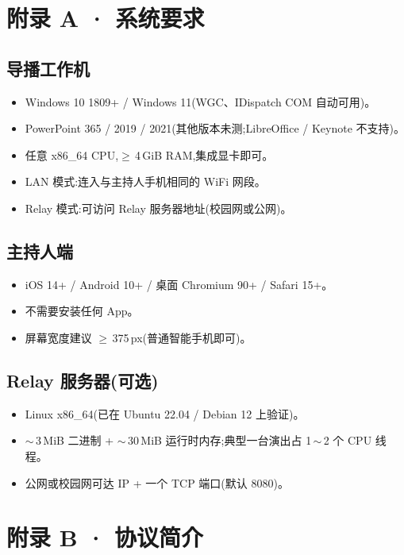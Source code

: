 \section*{附录 A · 系统要求}

\subsection*{导播工作机}
\begin{itemize}
  \item Windows 10 1809+ / Windows 11(WGC、IDispatch COM 自动可用)。
  \item PowerPoint 365 / 2019 / 2021(其他版本未测;LibreOffice / Keynote 不支持)。
  \item 任意 x86\_64 CPU,$\geq$\,4\,GiB RAM,集成显卡即可。
  \item LAN 模式:连入与主持人手机相同的 WiFi 网段。
  \item Relay 模式:可访问 Relay 服务器地址(校园网或公网)。
\end{itemize}

\subsection*{主持人端}
\begin{itemize}
  \item iOS 14+ / Android 10+ / 桌面 Chromium 90+ / Safari 15+。
  \item 不需要安装任何 App。
  \item 屏幕宽度建议 $\geq$\,375\,px(普通智能手机即可)。
\end{itemize}

\subsection*{Relay 服务器(可选)}
\begin{itemize}
  \item Linux x86\_64(已在 Ubuntu 22.04 / Debian 12 上验证)。
  \item $\sim$\,3\,MiB 二进制 + $\sim$\,30\,MiB 运行时内存;典型一台演出占 1\,$\sim$\,2 个 CPU 线程。
  \item 公网或校园网可达 IP + 一个 TCP 端口(默认 8080)。
\end{itemize}

\vspace{0.6em}

\section*{附录 B · 协议简介}

